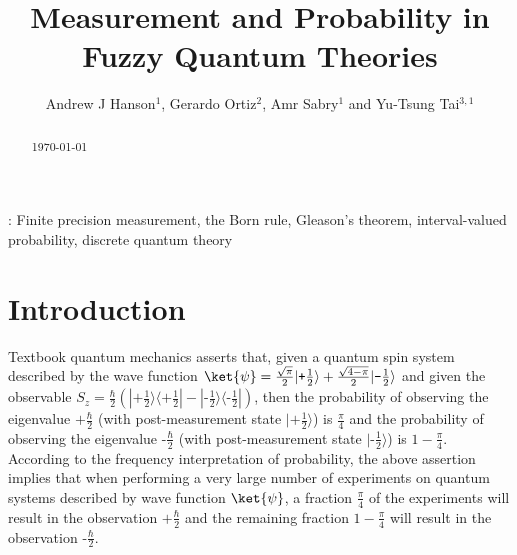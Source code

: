 \documentclass[12pt]{iopart}
\theoremstyle{plain}
\theoremstyle{definition}
\theoremstyle{remark}
\newcommand{\fket}[1]{{|#1\rangle}}
\newcommand{\fproj}[1]{|#1\rangle\langle #1|}
\newcommand{\ps}{\texttt{+}}
\newcommand{\minus}{\texttt{-}}
\begin{document}
\title{Measurement and Probability in Fuzzy Quantum
Theories}

\author{Andrew J Hanson$^{1}$, Gerardo Ortiz$^{2}$,
Amr Sabry$^{1}$ and Yu-Tsung Tai$^{3,1}$}
\address{$^{1}$ School of Informatics and Computing, Indiana
University, Bloomington, IN 47405, USA}
\address{$^{2}$ Department of Physics, Indiana University, Bloomington, IN
47405, USA}
\address{$^{3}$ Department of Mathematics, Indiana University, Bloomington,
IN 47405, USA}
\begin{abstract}
\today
\end{abstract}
: {Finite precision measurement, the Born rule, Gleason's theorem, interval-valued
probability, discrete quantum theory}

\submitto{\jpa}

\section{Introduction}

Textbook quantum mechanics asserts that, given a quantum spin system
described by the wave function
$\ket{\psi}=\frac{\sqrt{\pi}}{2}\fket{\ps\frac{1}{2}}+\frac{\sqrt{4-\pi}}{2}\fket{\minus\frac{1}{2}}$
and given the observable
$S_z =
\frac{\hbar}{2}(\fproj{\ps\frac{1}{2}}-\fproj{\minus\frac{1}{2}})$,
then the probability of observing the eigenvalue $\ps\frac{\hbar}{2}$
(with post-measurement state $\fket{\ps\frac{1}{2}}$) is
$\frac{\pi}{4}$ and the probability of observing the eigenvalue
$\minus\frac{\hbar}{2}$ (with post-measurement state
$\fket{\minus\frac{1}{2}}$) is $1-\frac{\pi}{4}$. According to the
frequency interpretation of probability, the above assertion implies
that when performing a very large number of experiments on quantum
systems described by wave function $\ket{\psi}$, a fraction
$\frac{\pi}{4}$ of the experiments will result in the observation
$\ps\frac{\hbar}{2}$ and the remaining fraction $1-\frac{\pi}{4}$ will
result in the observation $\minus\frac{\hbar}{2}$.
\end{document}
